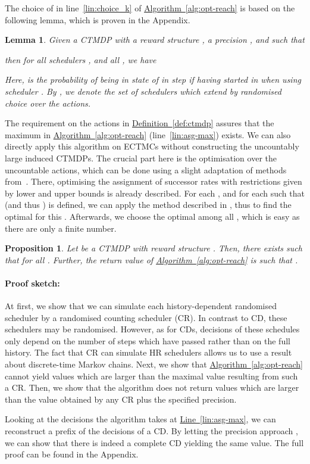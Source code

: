 \documentclass[10pt,twocolumn]{article}
\newenvironment{proofsketch}{\paragraph{Proof sketch:}}{\hfill}
\newtheorem{lemma}{Lemma}
\newtheorem{proposition}{Proposition}
\newcommand{\refdef}[1]{\texorpdfstring{\hyperref[def:#1]{Definition~\ref*{def:#1}}}{Definition \ref*{def:#1}}}
\newcommand{\refalg}[1]{\texorpdfstring{\hyperref[alg:#1]{Algorithm~\ref*{alg:#1}}}{Algorithm~\ref*{alg:#1}}}
\newcommand{\reflin}[1]{\texorpdfstring{\hyperref[lin:#1]{Line~\ref*{lin:#1}}}{Line~\ref*{lin:#1}}}
\begin{document}
The choice of  in line~\ref{lin:choice_k} of \refalg{opt-reach} 
is based on the following lemma, which is proven in the Appendix.
\begin{lemma}
  \label{lem:precbound}
  Given a CTMDP  with a reward structure , a precision , and  such that
  
  then for all schedulers , and all , we have

Here,  is the probability of being in state  of  in step  if having started in  when using scheduler .
By , we denote the set of schedulers which extend  by randomised choice over the actions.
\end{lemma}
The requirement on the actions in \refdef{ctmdp} assures that the
maximum in \refalg{opt-reach} (line~\ref{lin:asg-max}) exists. We can also directly apply this
algorithm on ECTMCs without constructing the uncountably large induced
CTMDPs. The crucial part here is the optimisation over the
uncountable actions, which can be done using a slight adaptation of
methods from~\cite[Chapter 4.1]{Klink10}. There, optimising the
assignment of successor rates with restrictions given by lower and
upper bounds is already described. 
For each , and for each  such that  (and thus ) is defined, we can apply the method described in \cite[Chapter 4.1]{Klink10}, thus to find the optimal  for this .
Afterwards, we choose the optimal  among all , which is easy as there are only a finite number.
\begin{proposition}
  \label{pro:algo-correctness}
Let  be a CTMDP with reward structure .
  Then, there exists  such that  for all .
  Further, the return value  of \refalg{opt-reach} is such 
  that .
\end{proposition}
\begin{proofsketch}
  At first, we show that we can simulate each history-dependent
  randomised scheduler by a randomised counting scheduler (CR).
  In contrast to CD, these schedulers may be randomised.
  However, as for CDs, decisions of these schedules only depend on the number of steps which have passed rather than on the full history.
  The fact that CR can simulate HR schedulers allows us to use a result about discrete-time Markov chains.
  Next, we show that \refalg{opt-reach} cannot yield values which are
  larger than the maximal value resulting from such a CR. Then, we show
  that the algorithm does not return values which are larger than the
  value obtained by any CR plus the specified precision.

  Looking at the decisions the algorithm takes at \reflin{asg-max}, we
  can reconstruct a prefix of the decisions of a CD. By letting the
  precision approach , we can show that there is indeed a complete CD
  yielding the same value.
\end{proofsketch}
The full proof can be found in the Appendix.
\end{document}
